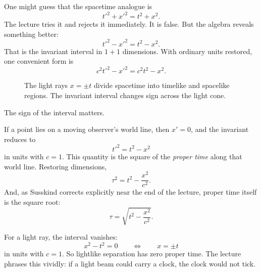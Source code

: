 One might guess that the spacetime analogue is
\begin{equation}
t'^2+x'^2=t^2+x^2.
\end{equation}
The lecture tries it and rejects it immediately. It is false. But the algebra reveals something better:
\begin{equation}
t'^2-x'^2=t^2-x^2.
\end{equation}
That is the invariant interval in \(1+1\) dimensions. With ordinary units restored, one convenient form is
\begin{equation}
c^2t'^2-x'^2=c^2t^2-x^2.
\end{equation}

\begin{figure}
\centering
{}
\caption{The light rays \(x=\pm t\) divide spacetime into timelike and spacelike regions. The invariant interval changes sign across the light cone.}
\end{figure}

The sign of the interval matters.

If a point lies on a moving observer's world line, then \(x'=0\), and the invariant reduces to
\begin{equation}
t'^2=t^2-x^2
\end{equation}
in units with \(c=1\). This quantity is the square of the \emph{proper time} along that world line. Restoring dimensions,
\begin{equation}
\tau^2=t^2-\frac{x^2}{c^2}.
\end{equation}
And, as Susskind corrects explicitly near the end of the lecture, proper time itself is the square root:
\begin{equation}
\tau=\sqrt{t^2-\frac{x^2}{c^2}}.
\end{equation}

For a light ray, the interval vanishes:
\begin{equation}
x^2-t^2=0
\qquad\Longleftrightarrow\qquad
x=\pm t
\end{equation}
in units with \(c=1\). So lightlike separation has zero proper time. The lecture phrases this vividly: if a light beam could carry a clock, the clock would not tick.

